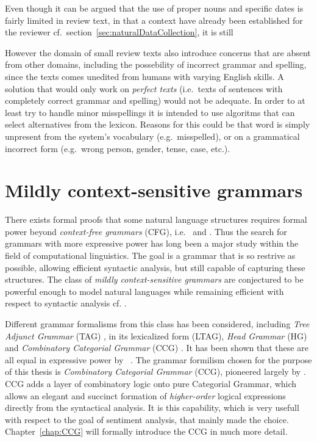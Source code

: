 Even though it can be argued that the use of proper nouns and specific dates is fairly limited in review text, in that a context have already been established for the reviewer cf.\ section~\ref{sec:naturalDataCollection}, it is still 


However the domain of small review texts also introduce concerns that are absent from other domains, including the possebility of incorrect grammar and spelling, since the texts comes unedited from humans with varying English skills. A solution that would only work on \emph{perfect texts} (i.e.\ texts of sentences with completely correct grammar and spelling) would not be adequate. In order to at least try to handle minor misspellings it is intended to use algoritms that can select alternatives from the lexicon. Reasons for this could be that word is simply unpresent from the system's vocabulary (e.g.\ misspelled), or on a grammatical incorrect form (e.g.\ wrong person, gender, tense, case, etc.). 

\section{Mildly context-sensitive grammars}
There exists formal proofs that some natural language structures requires formal power beyond \emph{context-free grammars} (CFG), i.e.\ \cite{nlpNotCFG} and \cite{nlpNotCFG2}. Thus the search for grammars with more expressive power has long been a major study within the field of computational linguistics. The goal is a grammar that is so restrive as possible, allowing efficient syntactic analysis, but still capable of capturing these structures. The class of \emph{mildly context-sensitive grammars} are conjectured to be powerful enough to model natural languages while remaining efficient with respect to syntactic analysis cf. \cite{mildlyCSG}.

Different grammar formalisms from this class has been considered, including \emph{Tree Adjunct Grammar} (TAG) \cite{tag}, in its lexicalized form (LTAG), \emph{Head Grammar} (HG) \cite{hg} and \emph{Combinatory Categorial Grammar} (CCG) \cite{steedmanDraft}.
It has been shown that these are all equal in expressive power by \citeauthor{theEquivalence}~. The grammar formilism chosen for the purpose of this thesis is \emph{Combinatory Categorial Grammar} (CCG), pioneered largely by \citeauthor{sp} . CCG adds a layer of combinatory logic onto pure Categorial Grammar, which allows an elegant and succinct formation of \emph{higher-order} logical expressions directly from the syntactical analysis. It is this capability, which is very usefull with respect to the goal of sentiment analysis, that mainly made the choice. Chapter~\ref{chap:CCG} will formally introduce the CCG in much more detail.

